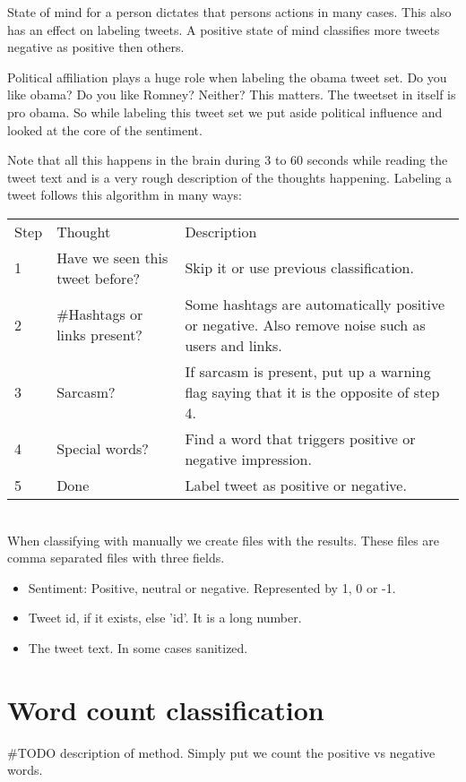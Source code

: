 State of mind for a person dictates that persons actions in many cases. This
also has an effect on labeling tweets. A positive state of mind classifies more
tweets negative as positive then others.

Political affiliation plays a huge role when labeling the obama tweet set. Do
you like obama? Do you like Romney? Neither? This matters. The tweetset in
itself is pro obama. So while labeling this tweet set we put aside political
influence and looked at the core of the sentiment.

Note that all this happens in the brain during 3 to 60 seconds while reading
the tweet text and is a very rough description of the thoughts happening.
Labeling a tweet follows this algorithm in many ways:

\begin{tabular}{ l p{5cm} p{7cm} }
Step & Thought & Description \\
1 & Have we seen this tweet before? & Skip it or use previous classification. \\
2 & \#Hashtags or links present? & Some hashtags are automatically positive or
negative. Also remove noise such as users and links.\\
3 & Sarcasm? & If sarcasm is present, put up a warning flag saying that it is
the opposite of step 4.\\
4 & Special words? & Find a word that triggers positive or negative
impression.\\
5 & Done & Label tweet as positive or negative.\\
\end{tabular}

\hspace{0pt}\\
When classifying with manually we create files with the results. These files
are comma separated files with three fields.
\begin{itemize}
    \item Sentiment: Positive, neutral or negative. Represented by 1, 0 or -1.
    \item Tweet id, if it exists, else 'id'. It is a long number.
    \item The tweet text. In some cases sanitized.
\end{itemize}
%

\section{Word count classification}\label{sentiment:word_count_classification}
#TODO description of method. 
Simply put we count the positive vs negative words. 

